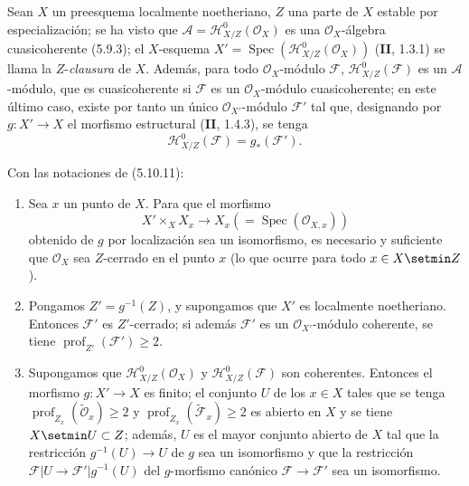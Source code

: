 \begin{env}[5.10.11]
\label{IV.2.s5.10.11-fr}
Sean $X$ un preesquema localmente noetheriano, $Z$ una parte de $X$ estable
por especialización; se ha visto que
$\mathcal A=\mathcal H^0_{X/Z}(\mathcal O_X)$ es una
$\mathcal O_X$-álgebra cuasicoherente (5.9.3); el $X$-esquema
$X'=\operatorname{Spec}(\mathcal H^0_{X/Z}(\mathcal O_X))$ (\textbf{II}, 1.3.1) se
llama la $Z$-\emph{clausura} de $X$. Además, para todo $\mathcal O_X$-módulo
$\mathcal F$, $\mathcal H^0_{X/Z}(\mathcal F)$ es un $\mathcal A$-módulo,
que es cuasicoherente si $\mathcal F$ es un $\mathcal O_X$-módulo
cuasicoherente; en este último caso, existe por tanto un único
$\mathcal O_{X'}$-módulo $\mathcal F'$ tal que, designando por
$g:X'\to X$ el morfismo estructural (\textbf{II}, 1.4.3), se tenga
\begin{equation}
\mathcal H^0_{X/Z}(\mathcal F)=g_*(\mathcal F').
\tag{5.10.11.1}\label{IV.2.s5.10.11.1-fr}
\end{equation}
\end{env}

\begin{proposition}[5.10.12]
\label{IV.2.s5.10.12-fr}
Con las notaciones de \textup{(5.10.11)}:
\begin{enumerate}
\item[\textup{(i)}] Sea $x$ un punto de $X$. Para que el morfismo
\[
X'\times_X X_x\longrightarrow X_x(=\operatorname{Spec}(\mathcal O_{X,x}))
\]
obtenido de $g$ por localización sea un isomorfismo, es necesario y suficiente
que $\mathcal O_X$ sea $Z$-cerrado en el punto $x$ (lo que ocurre para todo
$x\in X\setmin Z$).
\item[\textup{(ii)}] Pongamos $Z'=g^{-1}(Z)$, y supongamos que $X'$ es localmente
noetheriano. Entonces $\mathcal F'$ es $Z'$-cerrado; si además $\mathcal F'$ es
un $\mathcal O_{X'}$-módulo coherente, se tiene
$\operatorname{prof}_{Z'}(\mathcal F')\geq2$.
\item[\textup{(iii)}] Supongamos que $\mathcal H^0_{X/Z}(\mathcal O_X)$ y
$\mathcal H^0_{X/Z}(\mathcal F)$ son coherentes. Entonces el morfismo
$g:X'\to X$ es finito; el conjunto $U$ de los $x\in X$ tales que se tenga
$\operatorname{prof}_{Z_x}(\widetilde{\mathcal O}_x)\geq2$ y
$\operatorname{prof}_{Z_x}(\widetilde{\mathcal F}_x)\geq2$ es abierto en
$X$ y se tiene $X\setmin U\subset Z$; además, $U$ es el mayor conjunto abierto de $X$
tal que la restricción $g^{-1}(U)\to U$ de $g$ sea un isomorfismo y que la
restricción $\mathcal F|U\to\mathcal F'|g^{-1}(U)$ del $g$-morfismo canónico
$\mathcal F\to\mathcal F'$ sea un isomorfismo.
\end{enumerate}
\end{proposition}

